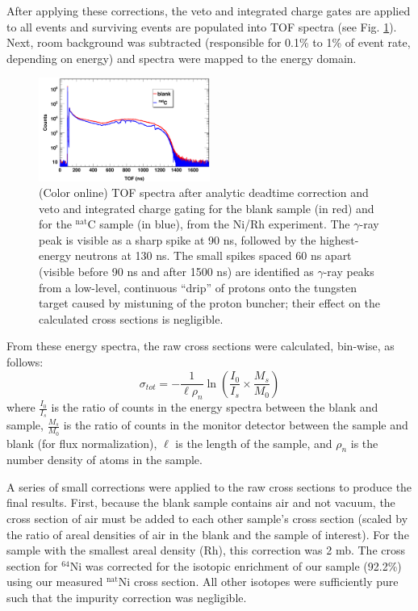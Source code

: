 \documentclass[twocolumn,secnumarabic,amssymb, nobibnotes, aps, prl,
superscriptaddress, nobalancelastpage]{revtex4}
\newcommand{\tot}{\ensuremath{\sigma_{tot}}}
\begin{document}
After applying these corrections, the veto and integrated charge gates are applied to 
all events and surviving events are populated into TOF spectra (see Fig.
\ref{ExampleTOFSpectrum}). Next, room background was subtracted (responsible for 0.1\% to 
1\% of event rate, depending on energy) and spectra were mapped to the energy domain.

\begin{figure}
    \includegraphics[width=0.5\textwidth]{figures/exampleTOFSpectrum.png}
    \caption{(Color online) TOF spectra after analytic deadtime correction and
        veto and integrated charge gating for the blank sample (in
        red) and for the $^{\text{nat}}$C sample (in blue), from the Ni/Rh experiment.
        The $\gamma$-ray peak is visible as a sharp spike at 90 ns, followed by
        the highest-energy neutrons at 130 ns. The small spikes spaced 60 ns
        apart (visible before 90 ns and after 1500
        ns) are identified as $\gamma$-ray peaks from a low-level, continuous
        ``drip'' 
        of protons onto the tungsten target caused by mistuning of the proton 
        buncher; their effect on the calculated cross sections is negligible.
    }
    \label{ExampleTOFSpectrum}
\end{figure}

From these energy spectra, the raw cross sections were calculated, bin-wise, as follows:
$$
\tot = -\frac{1}{\ell\rho_{n}}
\ln \left(\frac{I_{0}}{I_{s}}\times\frac{M_{s}}{M_{0}}\right)
$$
where $\frac{I_{0}}{I_{s}}$ is the ratio of counts in the energy spectra between 
the blank and sample, $\frac{M_{s}}{M_{0}}$ is the ratio of counts in the
monitor detector between the sample and blank (for flux normalization), $\ell$ is the length 
of the sample, and $\rho_{n}$ is the number density of atoms in the sample.

A series of small corrections were applied to the raw cross sections to produce
the final results. First, because the blank sample contains air and not vacuum,
the cross section of air must be added to each other sample's cross section (scaled by  
the ratio of areal densities of air in the blank and the sample of interest).
For the sample with the smallest areal density (Rh), this correction was 2 mb.
The cross section for $^{64}$Ni was corrected for the isotopic enrichment of our
sample (92.2\%) using our measured $^{\text{nat}}$Ni cross section. All other isotopes were 
sufficiently pure such that the impurity correction was negligible.
\end{document}
